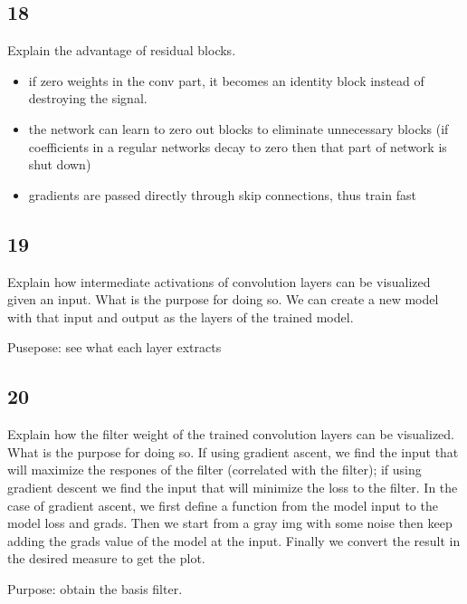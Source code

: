 \documentclass{article}
\begin{document}
\subsection*{18}
\begin{myleftlinebox}
    Explain the advantage of residual blocks.
    \tcbline
    \begin{itemize}
        \item if zero weights in the conv part, it becomes an identity block instead of destroying the signal.
        \item the network can learn to zero out blocks to eliminate unnecessary blocks (if coefficients in a regular networks decay to zero then that part of network is shut down)
        \item gradients are passed directly through skip connections, thus train fast
    \end{itemize}
\end{myleftlinebox}
\subsection*{19}
\begin{myleftlinebox}
    Explain how intermediate activations of convolution layers can be visualized given an input. What is the purpose for doing so.
    \tcbline
    We can create a new model with that input and output as the layers of the trained model.

    Pusepose: see what each layer extracts
\end{myleftlinebox}
\subsection*{20}
\begin{myleftlinebox}
    Explain how the filter weight of the trained convolution layers can be visualized. What is the purpose for doing so.
    \tcbline
    If using gradient ascent, we find the input that will maximize the respones of the filter (correlated with the filter); if using gradient descent we find the input that will minimize the loss to the filter.
    In the case of gradient ascent, we first define a function from the model input to the model loss and grads. Then we start from a gray img with some noise then keep adding the grads value of the model at the input. Finally we convert the result in the desired measure to get the plot.

    Purpose: obtain the basis filter.
\end{myleftlinebox}
\end{document}
